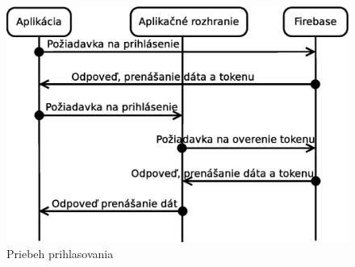 \begin{figure}[h]
  \centering
  \includegraphics[scale=0.5]{fig/login.eps}
  \caption{Priebeh prihlasovania}
  \label{fig:login}
\end{figure}

